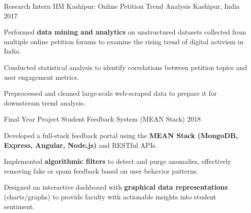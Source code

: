\begin{cventries}
  \cventry
    {Research Intern} %
    {IIM Kashipur: Online Petition Trend Analysis} %
    {Kashipur, India} %
    {2017} %
    {
      \begin{cvitems}
        \item {Performed \textbf{data mining and analytics} on unstructured datasets collected from multiple online petition forums to examine the rising trend of digital activism in India.}
        \item {Conducted statistical analysis to identify correlations between petition topics and user engagement metrics.}
        \item {Preprocessed and cleaned large-scale web-scraped data to prepare it for downstream trend analysis.}
      \end{cvitems}
    }
  \cventry
    {Final Year Project} %
    {Student Feedback System (MEAN Stack)} %
    {} %
    {2018} %
    {
      \begin{cvitems}
        \item {Developed a full-stack feedback portal using the \textbf{MEAN Stack (MongoDB, Express, Angular, Node.js)} and RESTful APIs.}
        \item {Implemented \textbf{algorithmic filters} to detect and purge anomalies, effectively removing fake or spam feedback based on user behavior patterns.}
        \item {Designed an interactive dashboard with \textbf{graphical data representations} (charts/graphs) to provide faculty with actionable insights into student sentiment.}
      \end{cvitems}
    }
\end{cventries}